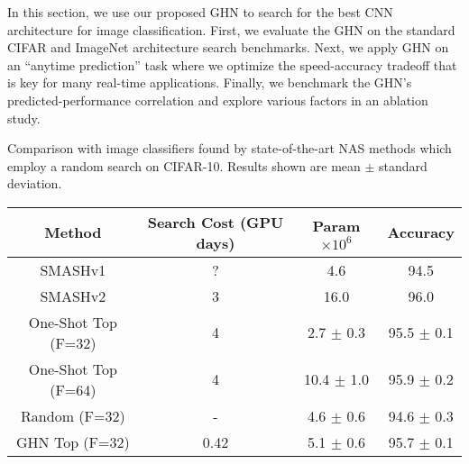 \documentclass{article} %
\begin{document}
In this section, we use our proposed GHN to search for the best CNN architecture for image
classification. First, we evaluate the GHN on the standard CIFAR \citep{krizhevsky2009cifar} and
ImageNet \citep{russakovsky2015imagenet} architecture search benchmarks. Next, we apply GHN on an
``anytime prediction'' task where we optimize the speed-accuracy tradeoff that is key for many
real-time applications. Finally, we benchmark the GHN's  predicted-performance correlation and
explore various factors in an ablation study.
\vspace{-0.7cm}
\caption{Comparison with image classifiers found by state-of-the-art NAS methods which employ a random search on CIFAR-10. Results shown are mean $\pm$ standard deviation.}
\label{table:Results1}
\footnotesize
\begin{center}
\begin{tabular}{ c c c c } 
Method & Search Cost (GPU days) & Param $\times 10^6$ & Accuracy   \\ 
\hline
SMASHv1 \citep{brock2017smash} &? & 4.6 & 94.5 \\
SMASHv2 \citep{brock2017smash} & 3 & 16.0 & 96.0\\
One-Shot Top (F=32) \citep{bender2018understanding} & 4  & 2.7 $\pm$ 0.3 & 95.5 $\pm$ 0.1\\
One-Shot Top (F=64) \citep{bender2018understanding} & 4 & 10.4 $\pm$ 1.0 & 95.9 $\pm$ 0.2\\
\hline
\hline
Random (F=32) & - & 4.6 $\pm$ 0.6 & 94.6 $\pm$ 0.3\\ 
GHN Top (F=32) &  0.42  & 5.1 $\pm$ 0.6 & 95.7 $\pm$ 0.1\\ 
\end{tabular}
\end{center}
\end{document}
